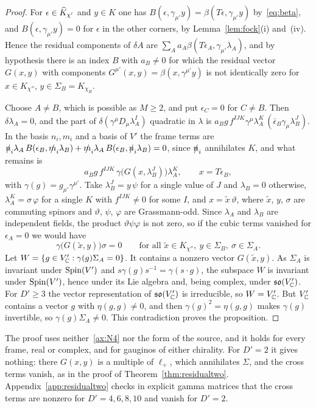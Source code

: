\begin{proof}
For $\epsilon\in\widehat{K}_{\chi'}$ and $y\in K$ one has $B(\epsilon,\gamma_{\mu'}y)=\beta(T\epsilon,\gamma_{\mu'}y)$ by~\eqref{eq:beta}, and $B(\epsilon,\gamma_{\mu'}y)=0$ for $\epsilon$ in the other corners, by Lemma~\ref{lem:fock}(i) and~(iv). Hence the residual components of $\delta A$ are $\sum_Aa_A\beta(T\epsilon_A,\gamma_{\mu'}\lambda_A)$, and by hypothesis there is an index $B$ with $a_B\ne0$ for which the residual vector $G(x,y)$ with components $G^{\mu'}(x,y)=\beta(x,\gamma^{\mu'}y)$ is not identically zero for $x\in K_{\chi''}$, $y\in\Sigma_B=K_{\chi_B}$.

Choose $A\ne B$, which is possible as $M\ge2$, and put $\epsilon_C=0$ for $C\ne B$. Then $\delta\lambda_A=0$, and the part of $\delta(\gamma^\mu D_\mu\lambda^I_A)$ quadratic in $\lambda$ is $a_Bg\,f^{IJK}\gamma^\mu\lambda^K_A\,(\bar\epsilon_B\gamma_\mu\lambda^J_B)$. In the basis $n_i,m_i$ and a basis of $V'$ the frame terms are $\slashed{n}_i\lambda_A\,B(\epsilon_B,\slashed{m}_i\lambda_B)+\slashed{m}_i\lambda_A\,B(\epsilon_B,\slashed{n}_i\lambda_B)=0$, since $\slashed{n}_i$ annihilates $K$, and what remains is
\[
a_Bg\,f^{IJK}\,\gamma\bigl(G(x,\lambda^J_B)\bigr)\lambda^K_A ,\qquad x=T\epsilon_B,
\]
with $\gamma(g)=g_{\mu'}\gamma^{\mu'}$. Take $\lambda^J_B=y\,\psi$ for a single value of $J$ and $\lambda_B=0$ otherwise, $\lambda^K_A=\sigma\,\varphi$ for a single $K$ with $f^{IJK}\ne0$ for some $I$, and $x=\tilde x\,\vartheta$, where $\tilde x$, $y$, $\sigma$ are commuting spinors and $\vartheta$, $\psi$, $\varphi$ are Grassmann-odd. Since $\lambda_A$ and $\lambda_B$ are independent fields, the product $\vartheta\psi\varphi$ is not zero, so if the cubic terms vanished for $\epsilon_A=0$ we would have
\[
\gamma\bigl(G(\tilde x,y)\bigr)\sigma=0\qquad\text{for all }\tilde x\in K_{\chi''},\ y\in\Sigma_B,\ \sigma\in\Sigma_A .
\]
Let $W=\{g\in V'_{\mathbb{C}}:\gamma(g)\Sigma_A=0\}$. It contains a nonzero vector $G(\tilde x,y)$. As $\Sigma_A$ is invariant under $\operatorname{Spin}(V')$ and $s\gamma(g)s^{-1}=\gamma(s\cdot g)$, the subspace $W$ is invariant under $\operatorname{Spin}(V')$, hence under its Lie algebra and, being complex, under $\mathfrak{so}(V'_{\mathbb{C}})$. For $D'\ge3$ the vector representation of $\mathfrak{so}(V'_{\mathbb{C}})$ is irreducible, so $W=V'_{\mathbb{C}}$. But $V'_{\mathbb{C}}$ contains a vector $g$ with $\eta(g,g)\ne0$, and then $\gamma(g)^2=\eta(g,g)$ makes $\gamma(g)$ invertible, so $\gamma(g)\Sigma_A\ne0$. This contradiction proves the proposition.
\end{proof}

The proof uses neither~\ref{ax:N4} nor the form of the source, and it holds for every frame, real or complex, and for gauginos of either chirality. For $D'=2$ it gives nothing: there $G(x,y)$ is a multiple of $\ell_+$, which annihilates $\Sigma$, and the cross terms vanish, as in the proof of Theorem~\ref{thm:residualtwo}. Appendix~\ref{app:residualtwo} checks in explicit gamma matrices that the cross terms are nonzero for $D'=4,6,8,10$ and vanish for $D'=2$.

